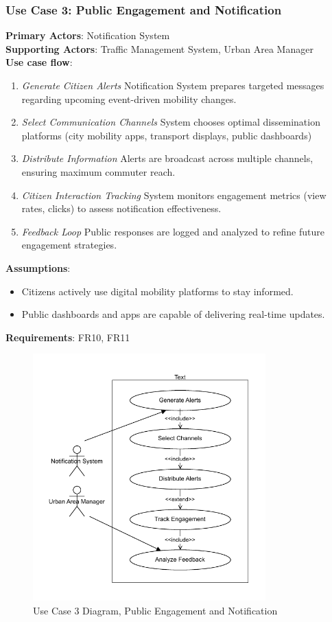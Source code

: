 \documentclass[a4paper,12pt]{article}
\begin{document}
\subsubsection*{Use Case 3: Public Engagement and Notification}
\textbf{Primary Actors}: Notification System \\
\textbf{Supporting Actors}: Traffic Management System, Urban Area Manager\\
\textbf{Use case flow}: 
\begin{enumerate}
    \item \textit{Generate Citizen Alerts}  Notification System prepares targeted messages regarding upcoming event-driven mobility changes.
    \item \textit{Select Communication Channels} System chooses optimal dissemination platforms (city mobility apps, transport displays, public dashboards)
    \item \textit{Distribute Information} Alerts are broadcast across multiple channels, ensuring maximum commuter reach.
    \item \textit{Citizen Interaction Tracking} System monitors engagement metrics (view rates, clicks) to assess notification effectiveness.
    \item \textit{Feedback Loop}  Public responses are logged and analyzed to refine future engagement strategies.
\end{enumerate}
\textbf{Assumptions}: 
\begin{itemize}
    \item Citizens actively use digital mobility platforms to stay informed.
    \item Public dashboards and apps are capable of delivering real-time updates.
\end{itemize}
\textbf{Requirements}: FR10, FR11
\\
\newpage

\begin{figure}[h]
    \centering
    \includegraphics[width=0.8\textwidth]{diagrams/Public_Engagement_and_Notification.drawio.pdf}
    \caption{Use Case 3 Diagram, Public Engagement and Notification}
    \label{fig:Public_Engagement_and_Notification.drawio}
\end{figure}
\end{document}
